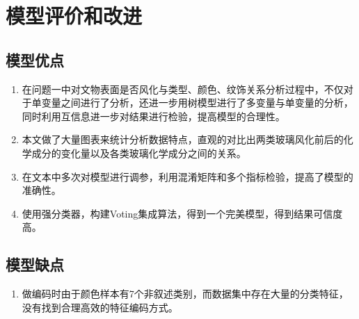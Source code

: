 \section{模型评价和改进}



\subsection{模型优点}

\begin{enumerate}
	\item 在问题一中对文物表面是否风化与类型、颜色、纹饰关系分析过程中，不仅对于单变量之间进行了分析，还进一步用树模型进行了多变量与单变量的分析，同时利用互信息进一步对结果进行检验，提高模型的合理性。
	\item 本文做了大量图表来统计分析数据特点，直观的对比出两类玻璃风化前后的化学成分的变化量以及各类玻璃化学成分之间的关系。
	\item 在文本中多次对模型进行调参，利用混淆矩阵和多个指标检验，提高了模型的准确性。
	\item 使用强分类器，构建Voting集成算法，得到一个完美模型，得到结果可信度高。
\end{enumerate}



\subsection{模型缺点}

\begin{enumerate}
	\item 做编码时由于颜色样本有7个非叙述类别，而数据集中存在大量的分类特征，没有找到合理高效的特征编码方式。
\end{enumerate}



